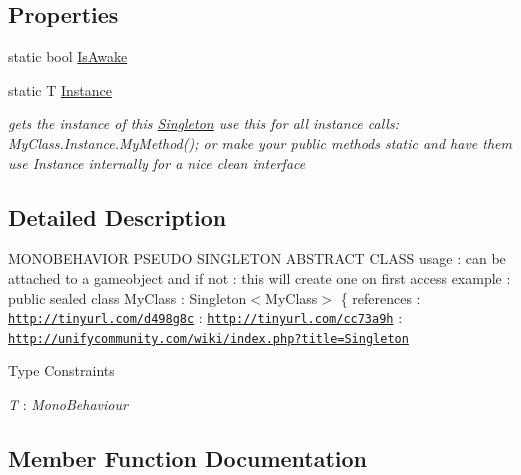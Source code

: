 \subsection*{Properties}
\begin{DoxyCompactItemize}
\item 
static bool \hyperlink{class_singleton_af6b75d5d3b4e230ca3caeb79c686b157}{Is\+Awake}
\item 
static T \hyperlink{class_singleton_a54103e8475b2a352ee759d5732307534}{Instance}
\begin{DoxyCompactList}\small\item\em gets the instance of this \hyperlink{class_singleton}{Singleton} use this for all instance calls\+: My\+Class.\+Instance.\+My\+Method(); or make your public methods static and have them use Instance internally for a nice clean interface \end{DoxyCompactList}\end{DoxyCompactItemize}


\subsection{Detailed Description}
M\+O\+N\+O\+B\+E\+H\+A\+V\+I\+OR P\+S\+E\+U\+DO S\+I\+N\+G\+L\+E\+T\+ON A\+B\+S\+T\+R\+A\+CT C\+L\+A\+SS usage \+: can be attached to a gameobject and if not \+: this will create one on first access example \+: \textquotesingle{}\textquotesingle{}\textquotesingle{}public sealed class My\+Class \+: Singleton$<$\+My\+Class$>$ \{\textquotesingle{}\textquotesingle{}\textquotesingle{} references \+: \href{http://tinyurl.com/d498g8c}{\tt http\+://tinyurl.\+com/d498g8c} \+: \href{http://tinyurl.com/cc73a9h}{\tt http\+://tinyurl.\+com/cc73a9h} \+: \href{http://unifycommunity.com/wiki/index.php?title=Singleton}{\tt http\+://unifycommunity.\+com/wiki/index.\+php?title=\+Singleton} 

\begin{Desc}
\item[Type Constraints]\begin{description}
\item[{\em T} : {\em Mono\+Behaviour}]\end{description}
\end{Desc}


\subsection{Member Function Documentation}
